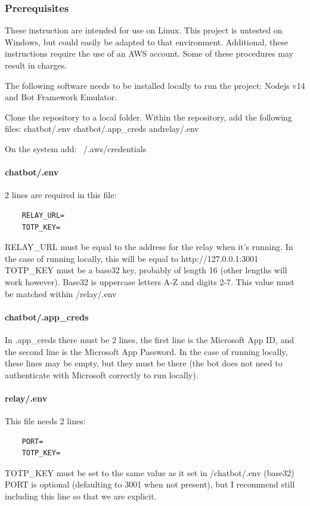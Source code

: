\documentclass[onecolumn, draftclsnofoot,10pt, compsoc]{IEEEtran}
\begin{document}
\subsubsection{Prerequisites}
These instruction are intended for use on Linux.
This project is untested on Windows, but could easily be adapted to that environment.
Additional, these instructions require the use of an AWS account.
Some of these procedures may result in charges.

The following software needs to be installed locally to run the project: Nodejs v14 and Bot Framework Emulator.

Clone the repository to a local folder.
Within the repository, add the following files: chatbot/.env chatbot/.app\_creds andrelay/.env

On the system add: ~/.aws/credentials

\paragraph{chatbot/.env}
2 lines are required in this file:
\begin{verbatim}
    RELAY_URL=
    TOTP_KEY=
\end{verbatim}

RELAY\_URL must be equal to the address for the relay when it's running.
In the case of running locally, this will be equal to http://127.0.0.1:3001 TOTP\_KEY must be a base32 key, probably of length 16 (other lengths will work however).
Base32 is uppercase letters A-Z and digits 2-7. This value must be matched within /relay/.env

\paragraph{chatbot/.app\_creds}
In .app\_creds there must be 2 lines, the first line is the Microsoft App ID, and the second line is the Microsoft App Password.
In the case of running locally, these lines may be empty, but they must be there (the bot does not need to authenticate with Microsoft correctly to run locally).

\paragraph{relay/.env}
This file needs 2 lines:
\begin{verbatim}
    PORT=
    TOTP_KEY=
\end{verbatim}

TOTP\_KEY must be set to the same value as it set in /chatbot/.env (base32) PORT is optional (defaulting to 3001 when not present), but I recommend still including this line so that we are explicit.
\end{document}
